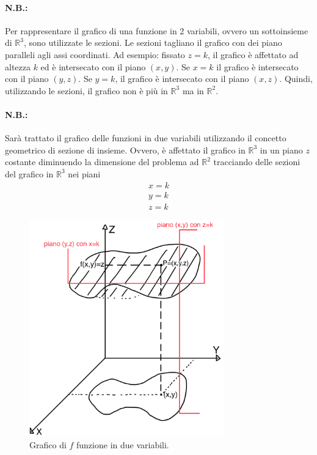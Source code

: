\paragraph{N.B.:} Per rappresentare il grafico di una funzione in 2 variabili, ovvero un sottoinsieme di $\mathbb R^3$, sono utilizzate le sezioni. Le sezioni tagliano il grafico con dei piano paralleli agli assi coordinati. Ad esempio: fissato $z=k$, il grafico è affettato ad altezza $k$ ed è intersecato con il piano $(x,y)$. Se $x=k$ il grafico è intersecato con il piano $(y,z)$. Se $y=k$, il grafico è intersecato con il piano $(x,z)$. Quindi, utilizzando le sezioni, il grafico non è più in $\mathbb R^3$ ma in $\mathbb R^2$.

\paragraph{N.B.:} Sarà trattato il grafico delle funzioni in due variabili utilizzando il concetto geometrico di sezione di insieme. Ovvero, è affettato il grafico in $\mathbb R^3$ in un piano $z$ costante diminuendo la dimensione del problema ad $\mathbb R^2$ tracciando delle sezioni del grafico in $\mathbb R^3$ nei piani
\begin{equation}\label{eq:piani}
    \begin{matrix}
        x=k\\
        y=k\\
        z=k
    \end{matrix}
\end{equation}

\begin{figure}
\centering
    \includegraphics[width=0.75\textwidth]{Analisi2/figures/grafico_f_generica_R3.jpg}
    \caption{Grafico di $f$ funzione in due variabili.}\label{fig:grafico_f_generica_R3}
\end{figure}

